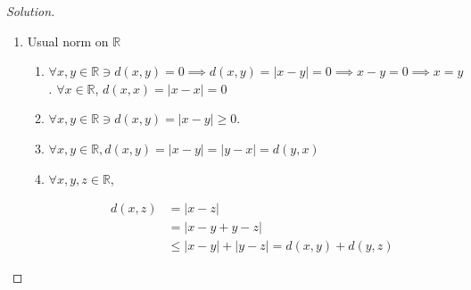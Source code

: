 \documentclass{article}
\newcommand{\R}{\mathbb{R}}
\newcommand{\abs}[1]{\left\lvert #1\right\rvert}
\newenvironment{solution}
{\renewcommand\qedsymbol{$\blacksquare$}\begin{proof}[Solution]}
{\end{proof}}
\begin{document}
\begin{solution}
    \begin{enumerate}
        \item Usual norm on $\R$
        \begin{enumerate}
            \item $\forall x, y \in \R \ni d(x, y) = 0 \implies d(x, y) = \abs{x - y} = 0 \implies x - y = 0 \implies x = y$. $\forall x \in \R$, $d(x,x) = \abs{x - x} = 0$
            \item $\forall x, y \in \R \ni d(x, y) = \abs{x - y} \geq 0$. 
            \item $\forall x, y \in \R , d(x, y) = \abs{x - y}= \abs{y - x} = d(y, x)$
            \item $\forall x, y, z \in \R$, 
            
            \begin{align*}
                d(x, z) &= \abs{x - z}\\
                &= \abs{x - y + y - z}\\
                &\leq \abs{x - y} + \abs{y - z} = d(x, y) + d(y, z)
            \end{align*}
        \end{enumerate}
        

\end{enumerate}
\end{solution}
\end{document}
